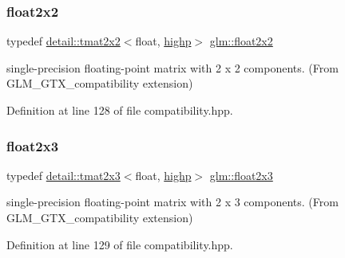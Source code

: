 \mbox{\label{group__gtx__compatibility_gaa4a1e4449913b2437f12434ed713dd73}} 
\subsubsection{\texorpdfstring{float2x2}{float2x2}}
{\footnotesize\ttfamily typedef \hyperlink{structglm_1_1detail_1_1tmat2x2}{detail\+::tmat2x2}$<$float, \hyperlink{namespaceglm_a0f04f086094c747d227af4425893f545ac6f7eab42eacbb10d59a58e95e362074}{highp}$>$ \hyperlink{group__gtx__compatibility_gaa4a1e4449913b2437f12434ed713dd73}{glm\+::float2x2}}



single-\/precision floating-\/point matrix with 2 x 2 components. (From G\+L\+M\+\_\+\+G\+T\+X\+\_\+compatibility extension) 



Definition at line 128 of file compatibility.\+hpp.

\mbox{\label{group__gtx__compatibility_gaf6c91675c075853da392b1d2dfc45f65}} 
\subsubsection{\texorpdfstring{float2x3}{float2x3}}
{\footnotesize\ttfamily typedef \hyperlink{structglm_1_1detail_1_1tmat2x3}{detail\+::tmat2x3}$<$float, \hyperlink{namespaceglm_a0f04f086094c747d227af4425893f545ac6f7eab42eacbb10d59a58e95e362074}{highp}$>$ \hyperlink{group__gtx__compatibility_gaf6c91675c075853da392b1d2dfc45f65}{glm\+::float2x3}}



single-\/precision floating-\/point matrix with 2 x 3 components. (From G\+L\+M\+\_\+\+G\+T\+X\+\_\+compatibility extension) 



Definition at line 129 of file compatibility.\+hpp.

\mbox{\label{group__gtx__compatibility_gaaff795523eb814705d3f1cc7fd3421f2}} 

